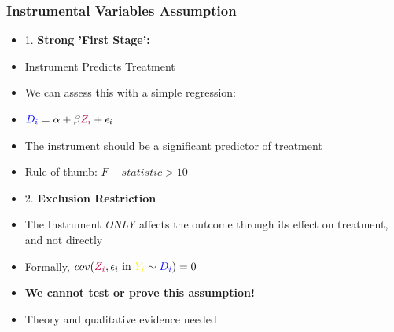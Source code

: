 \documentclass[xcolor=x11names,compress]{beamer}\usepackage[]{graphicx}\usepackage[]{color}
\renewcommand{\(}{\begin{columns}}
\renewcommand{\)}{\end{columns}}
\newcommand{\<}[1]{\begin{column}{#1}}
\renewcommand{\>}{\end{column}}
\begin{document}
\begin{frame}
\frametitle{Instrumental Variables Assumption}
\begin{multicols}{2}
\begin{itemize}
\item 1. \textbf{Strong 'First Stage':}
\pause
\item Instrument Predicts Treatment
\pause
\item We can assess this with a simple regression:
\pause
\item $\textcolor{blue}{D_i} = \alpha + \beta \textcolor{purple}{Z_i} + \epsilon_i$
\pause
\item The instrument should be a significant predictor of treatment
\pause
\item Rule-of-thumb: $F-statistic > 10$
\end{itemize}
\columnbreak
\begin{itemize}
\item 2. \textbf{Exclusion Restriction} 
\pause
\item The Instrument \textit{ONLY} affects the outcome through its effect on treatment, and not directly
\pause
\item Formally, $cov(\textcolor{purple}{Z_i}, \epsilon_i \text{ in } \textcolor{yellow}{Y_i} \sim \textcolor{blue}{D_i})=0$
\pause
\item \textbf{We cannot test or prove this assumption!}
\pause
\item Theory and qualitative evidence needed
\end{itemize}
\end{multicols}
\end{frame}
\end{document}

